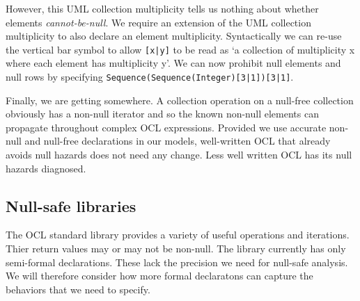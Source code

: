 \documentclass{llncs}
\begin{document}
However, this UML collection multiplicity tells us nothing about whether elements \textit{cannot-be-null}. We require an extension of the UML collection multiplicity to also declare an element multiplicity. Syntactically we can re-use the vertical bar symbol to allow \verb$[x|y]$ to be read as `a collection of multiplicity x where each element has multiplicity y'. We can now prohibit null elements and null rows by specifying \verb$Sequence(Sequence(Integer)[3|1])[3|1]$.

Finally, we are getting somewhere. A collection operation on a null-free collection obviously has a non-null iterator and so the known non-null elements can propagate throughout complex OCL expressions. Provided we use accurate non-null and null-free declarations in our models, well-written OCL that already avoids null hazards does not need any change. Less well written OCL has its null hazards diagnosed.







\subsection{Null-safe libraries}

The OCL standard library provides a variety of useful operations and iterations. Thier return values may or may not be non-null. The library currently has only semi-formal declarations. These lack the precision we need for null-safe analysis. We  will therefore consider how more formal declaratons can capture the behaviors that we need to specify.
\end{document}
